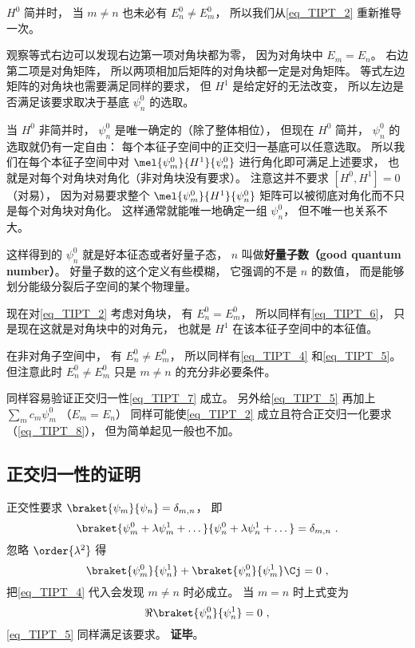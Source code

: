 $H^0$ 简并时， 当 $m\ne n$ 也未必有 $E_n^0 \ne E_m^0$， 所以我们从\autoref{eq_TIPT_2} 重新推导一次。

观察等式右边可以发现右边第一项对角块都为零， 因为对角块中 $E_m = E_n$。 右边第二项是对角矩阵， 所以两项相加后矩阵的对角块都一定是对角矩阵。 等式左边矩阵的对角块也需要满足同样的要求， 但 $H^1$ 是给定好的无法改变， 所以左边是否满足该要求取决于基底 $\psi_n^0$ 的选取。

当 $H^0$ 非简并时， $\psi_n^0$ 是唯一确定的（除了整体相位）， 但现在 $H^0$ 简并， $\psi_n^0$ 的选取就仍有一定自由： 每个本征子空间中的正交归一基底可以任意选取。 所以我们在每个本征子空间中对 $\mel{\psi_m^0}{H^1}{\psi_n^0}$ 进行角化即可满足上述要求， 也就是对每个对角块对角化（非对角块没有要求）。 注意这并不要求 $[H^0, H^1] = 0$ （对易）， 因为对易要求整个 $\mel{\psi_m^0}{H^1}{\psi_n^0}$ 矩阵可以被彻底对角化而不只是每个对角块对角化。 这样通常就能唯一地确定一组 $\psi_n^0$， 但不唯一也关系不大。

这样得到的 $\psi_n^0$ 就是好本征态或者好量子态， $n$ 叫做\textbf{好量子数（good quantum number）}。 好量子数的这个定义有些模糊， 它强调的不是 $n$ 的数值， 而是能够划分能级分裂后子空间的某个物理量。

现在对\autoref{eq_TIPT_2} 考虑对角块， 有 $E_n^0 = E_m^0$， 所以同样有\autoref{eq_TIPT_6}， 只是现在这就是对角块中的对角元， 也就是 $H^1$ 在该本征子空间中的本征值。

在非对角子空间中， 有 $E_n^0 \ne E_m^0$， 所以同样有\autoref{eq_TIPT_4} 和\autoref{eq_TIPT_5}。 但注意此时 $E_n^0 \ne E_m^0$ 只是 $m \ne n$ 的充分非必要条件。

同样容易验证正交归一性\autoref{eq_TIPT_7} 成立。 另外给\autoref{eq_TIPT_5} 再加上 $\sum_m c_m \psi_m^0$ （$E_m = E_n$） 同样可能使\autoref{eq_TIPT_2} 成立且符合正交归一化要求（\autoref{eq_TIPT_8}）， 但为简单起见一般也不加。

\subsection{正交归一性的证明}
正交性要求 $\braket{\psi_m}{\psi_n} = \delta_{m,n}$， 即
\begin{equation}\label{eq_TIPT_7}
\braket{\psi_m^0 + \lambda \psi_m^1 + \dots}{\psi_n^0 + \lambda \psi_n^1 + \dots} = \delta_{m,n}~.
\end{equation}
忽略 $\order{\lambda^2}$ 得
\begin{equation}\label{eq_TIPT_8}
\braket{\psi_m^0}{\psi_n^1} + \braket{\psi_n^0}{\psi_m^1}\Cj = 0~,
\end{equation}
把\autoref{eq_TIPT_4} 代入会发现 $m \ne n$ 时必成立。 当 $m = n$ 时上式变为
\begin{equation}
\Re{\braket{\psi_n^0}{\psi_n^1}} = 0~,
\end{equation}
\autoref{eq_TIPT_5} 同样满足该要求。 \textbf{证毕}。
